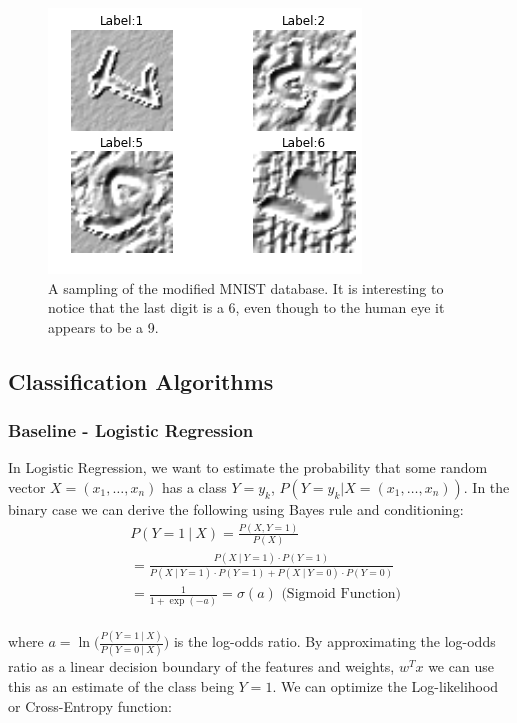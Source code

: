 \documentclass[conference]{IEEEtran}
\begin{document}
\begin{figure}[h]
	\centering
	\includegraphics[scale=0.40]{sample_of_images.png}
	\caption{A sampling of the modified MNIST database. It is interesting to notice that the last digit is a 6, even though to the human eye it appears to be a 9.}
	\label{MNISTSample}
\end{figure}

\subsection{Classification Algorithms}

\subsubsection{Baseline - Logistic Regression}
In Logistic Regression, we want to estimate the probability that some random vector $X=(x_1, \ldots, x_n)$ has a class $Y=y_k$, $P(Y=y_k | X=(x_1, \ldots, x_n))$. In the binary case we can derive the following using Bayes rule and conditioning:
\begin{equation*}
\begin{split}
&P(Y=1~|~X) = \frac{P(X, Y=1)}{P(X)}\\
&= \frac{ P(X~|~Y=1)\cdot P(Y=1) }{ P(X~|~Y=1)\cdot P(Y=1) + P(X~|~Y=0)\cdot P(Y=0) }\\
& = \frac{1}{1 + \exp{(-a)}} = \sigma(a) \text{~(Sigmoid Function)}\\
\end{split}
\end{equation*}

where $a=\ln\Big(\frac{P(Y=1~|~X)}{P(Y=0~|~X)}\Big)$ is the log-odds ratio. By approximating the log-odds ratio as a linear decision boundary of the features and weights, $w^T x$ we can use this as an estimate of the class being $Y=1$. We can optimize the Log-likelihood or Cross-Entropy function:
\end{document}
